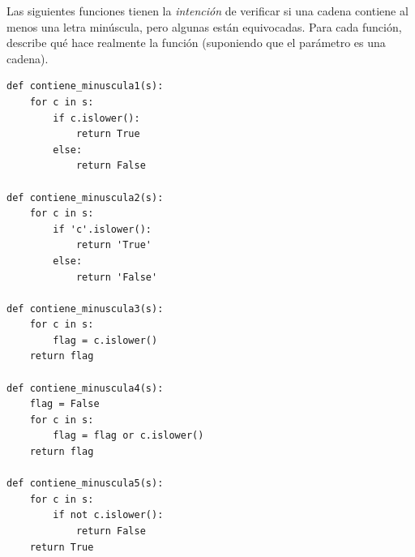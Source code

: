 \documentclass[10pt]{book}
\begin{document}
\begin{exercise}

Las siguientes funciones tienen la {\em intención} de verificar si una
cadena contiene al menos una letra minúscula, pero algunas están
equivocadas.  Para cada función, describe qué hace realmente la función
(suponiendo que el parámetro es una cadena).

\begin{verbatim}
def contiene_minuscula1(s):
    for c in s:
        if c.islower():
            return True
        else:
            return False

def contiene_minuscula2(s):
    for c in s:
        if 'c'.islower():
            return 'True'
        else:
            return 'False'

def contiene_minuscula3(s):
    for c in s:
        flag = c.islower()
    return flag

def contiene_minuscula4(s):
    flag = False
    for c in s:
        flag = flag or c.islower()
    return flag

def contiene_minuscula5(s):
    for c in s:
        if not c.islower():
            return False
    return True
\end{verbatim}

\end{exercise}
\end{document}

